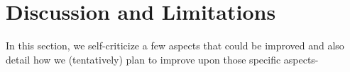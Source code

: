 


\section{Discussion and Limitations}
\vspace{-1mm}
In this section, we self-criticize a few aspects that could be improved and also detail how we (tentatively) plan to improve upon those specific aspects-
